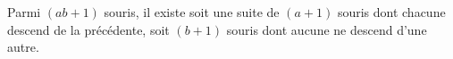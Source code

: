 Parmi $(ab + 1)$ souris, il existe soit une suite de $(a + 1)$ souris dont chacune descend de la précédente, soit $(b + 1)$ souris dont aucune ne descend d'une autre.
